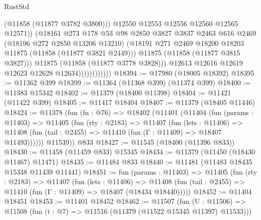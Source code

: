 \begin{lexlean}{RustStd}
\begin{coremodule}
                                    (@11858 (@11877 @3782 @3800)))
                                  @12550
                                  @12553
                                  @12556
                                  @12560
                                  @12565
                                  @12571))
                              (@18161
                                @273
                                @178
                                @53
                                @98
                                @2850
                                @3827
                                @3837
                                @2463
                                @616
                                @2469
                                (@18196 @272 @2850 @13206 @13210)
                                (@18191
                                  @271
                                  @2469
                                  @18200
                                  @18203
                                  @11875
                                  (@11858 (@11877 @3821 @2449)))
                                @11875
                                (@11858 (@11877 @3815 @3827)))
                              @11875
                              (@11858 (@11877 @3778 @3828)))
                            @12613
                            @12616
                            @12619
                            @12623
                            @12628
                            @12634))))))))))))
@18394 := @17980 (@18005 @18392)
@18395 := @11362 @399
@18399 := @11364 (@11368 @399) (@11374 @399)
@18400 := @11383 @15342
@18402 := @11379 (@18400 @11398)
@18404 := @11421 (@11422 @399)
@18405 := @11417 @18404
@18407 := @11379 (@18405 @11446)
@18424 := @11378
    (fun (fn : @76) =>
    @18402
      (@11401
        (@11404
          (fun (params : @11403) =>
          @11405
            (fun (rty : @2183) =>
            @11407
              (fun (lets : @11406) =>
              @11408 (fun (tail : @2455) => @11410 (fun (Γ : @11409) => @18407 @11493))))))
        @11539))
    @833
@18427 := @11545 (@18400 (@11396 @833))
@18430 := @11458 (@11459 @833) @15345
@18434 := @11379 (@11450 (@18430 @11467) @11471)
@18435 := @11484 @833
@18440 := @11481 (@11483 @18435 @15348 @11439 @11441)
@18451 := fun (params : @11403) =>
  @11405
    (fun (rty : @2183) =>
    @11407
      (fun (lets : @11406) =>
      @11408 (fun (tail : @2455) => @11410 (fun (Γ : @11409) => @18407 (@18434 @18440)))))
@18452 := @11404 @18451
@18453 := @11401 @18452
@18462 := @11507
    (fun (U : @11506) => @11508 (fun (t : @7) => @11516 (@11379 (@11522 @15345 @11397) @11533)))

\end{coremodule}
\end{lexlean}
